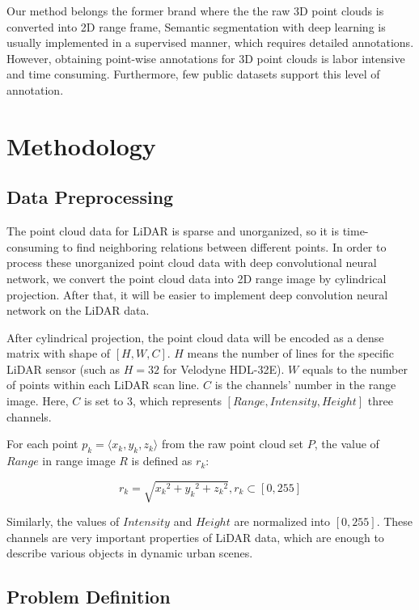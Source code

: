 	Our method belongs the former brand where the the raw 3D point clouds is converted into 2D range frame,  
	Semantic segmentation with deep learning is usually implemented in a supervised manner, which requires detailed annotations. However, obtaining point-wise annotations for 3D point clouds is labor intensive and time consuming. Furthermore, few public datasets support this level of annotation.  

\section{Methodology}

\subsection{Data Preprocessing}
The point cloud data for LiDAR is sparse and unorganized, so it is time-consuming to find neighboring relations between different points. In order to process these unorganized point cloud data with deep convolutional neural network, we convert the point cloud data into 2D range image by cylindrical projection. After that, it will be easier to implement deep convolution neural network on the LiDAR data.

After cylindrical projection, the point cloud data will be encoded as a dense matrix with shape of $[H,W,C]$. $H$ means the number of lines for the specific LiDAR sensor (such as $H=32$ for Velodyne HDL-32E). $W$ equals to the number of points within each LiDAR scan line. $C$ is the channels' number in the range image. Here, $C$ is set to 3, which represents $[Range,Intensity,Height]$ three channels.

For each point $p_k=\langle x_k,y_k,z_k\rangle$ from the raw point cloud set $P$, the value of $Range$ in range image $R$ is defined as $r_k$:
 
\begin{equation}
r_k=\sqrt{{x_k}^2+{y_k}^2+{z_k}^2},  r_k\subset [0,255]	
\end{equation} 

Similarly, the values of $Intensity$ and $Height$ are normalized into $[0,255]$. These channels are very important properties of LiDAR data, which are enough to describe various objects in dynamic urban scenes.
 
\subsection{Problem Definition}

